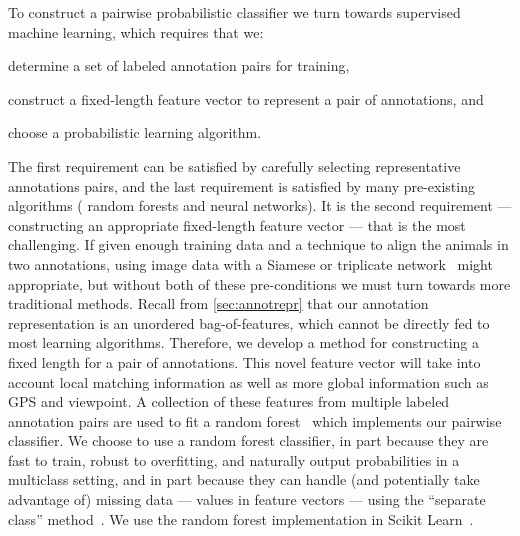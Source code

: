 \MatchStateExample{}

To construct a pairwise probabilistic classifier we turn towards supervised machine learning, which requires that
  we:
\begin{enumin}
    \item determine a set of labeled annotation pairs for training, 

    \item construct a fixed-length feature vector to represent a pair of annotations,  and

    \item choose a probabilistic learning algorithm.
\end{enumin}
The first requirement can be satisfied by carefully selecting representative annotations pairs, and the last
  requirement is satisfied by many pre-existing algorithms (\eg{} random forests and neural networks).
It is the second requirement --- constructing an appropriate fixed-length feature vector --- that is the most
  challenging.
If given enough training data and a technique to align the animals in two annotations, using image data with a
  Siamese or triplicate network~\cite{taigman_deepface_2014,schroff_facenet_2015} might appropriate, but without
  both of these pre-conditions we must turn towards more traditional methods.
Recall from \cref{sec:annotrepr} that our annotation representation is an unordered bag-of-features, which cannot
  be directly fed to most learning algorithms.
Therefore, we develop a method for constructing a fixed length  for a pair of
  annotations.
This novel feature vector will take into account local matching information as well as more global information
  such as GPS and viewpoint.
A collection of these features from multiple labeled annotation pairs are used to fit a random
  forest~\cite{breiman_random_2001} which implements our pairwise classifier.
We choose to use a random forest classifier, in part because they are fast to train, robust to overfitting, and
  naturally output probabilities in a multiclass setting, and in part because they can handle (and potentially take
  advantage of) missing data --- \ie{} \nan{} values in feature vectors --- using the ``separate class''
  method~\cite{ding_investigation_2010}.
We use the random forest implementation in Scikit Learn~\cite{pedregosa_scikit_learn_2011}.
  

